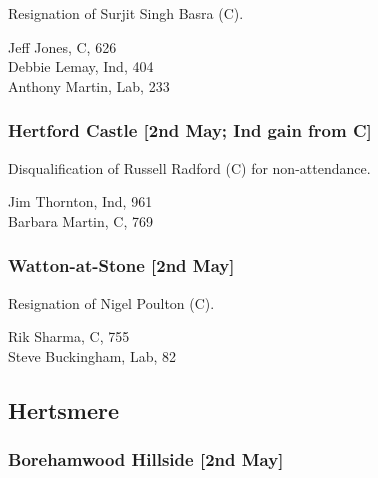 \documentclass[a4paper,openany,10pt]{book}
\begin{document}

Resignation of Surjit Singh Basra (C).



Jeff Jones, C, 626\\
Debbie Lemay, Ind, 404\\
Anthony Martin, Lab, 233\\


\subsubsection*{Hertford Castle \hspace*{\fill}\nolinebreak[1]%
\enspace\hspace*{\fill}
[2nd May; Ind gain from C]}


Disqualification of Russell Radford (C) for non-attendance.



Jim Thornton, Ind, 961\\
Barbara Martin, C, 769\\


\subsubsection*{Watton-at-Stone \hspace*{\fill}\nolinebreak[1]%
\enspace\hspace*{\fill}
[2nd May]}


Resignation of Nigel Poulton (C).



Rik Sharma, C, 755\\
Steve Buckingham, Lab, 82\\


\subsection*{Hertsmere}

\subsubsection*{Borehamwood Hillside \hspace*{\fill}\nolinebreak[1]%
\enspace\hspace*{\fill}
[2nd May]}
\end{document}
